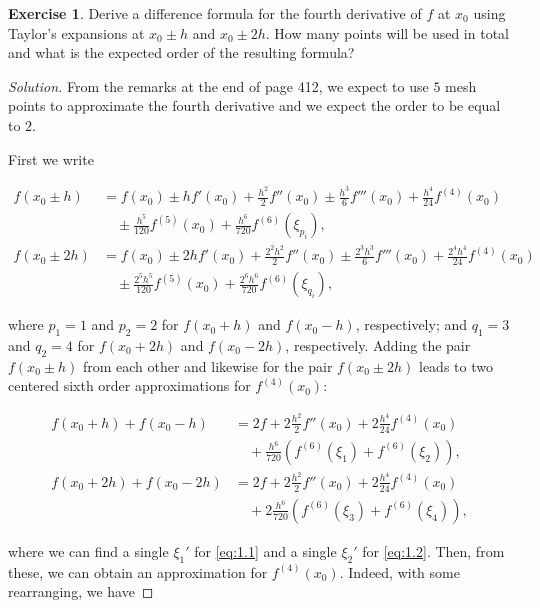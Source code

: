 \documentclass[12pt,a4]{article}
\theoremstyle{definition}
\newtheorem{exercise}{Exercise}
\begin{document}
\begin{exercise}
	Derive a difference formula for the fourth derivative of $f$ at $x_0$ using Taylor's expansions at $x_0 \pm h$ and $x_0 \pm 2 h$. How many points will be used in total and what is the expected order of the resulting formula?
\end{exercise}
\begin{proof}[Solution]
	From the remarks at the end of page 412, we expect to use $5$ mesh points to approximate the fourth derivative and we expect the order to be equal to $2$. 
	
	First we write
	
	\begin{align*}
	f(x_0 \pm h) &= f(x_0) \pm h f'(x_0) + \frac{h^2}{2} f''(x_0) \pm \frac{h^3}{6} f'''(x_0) + \frac{h^4}{24} f^{(4)}(x_0) \\
	 &\quad \pm \frac{h^5}{120} f^{(5)}(x_0) + \frac{h^6}{720} f^{(6)}(\xi_{p_i}) {,} \\
	f(x_0 \pm 2 h) &= f(x_0) \pm 2 h f'(x_0) + \frac{2^2 h^2}{2} f''(x_0) \pm \frac{2^3 h^3}{6} f'''(x_0) + \frac{2^4 h^4}{24} f^{(4)}(x_0) \\
	&\quad \pm \frac{2^5 h^5}{120} f^{(5)}(x_0) + \frac{2^6 h^6}{720} f^{(6)}(\xi_{q_i}) {,}
	\end{align*}
	
	\noindent where $p_1 = 1$ and $p_2 = 2$ for $f(x_0 + h)$ and $f(x_0 - h)$, respectively; and $q_1 = 3$ and $q_2 = 4$ for $f(x_0 + 2 h)$ and $f(x_0 - 2 h)$, respectively. Adding the pair $f(x_0 \pm h)$ from each other and likewise for the pair $f(x_0 \pm 2 h)$ leads to two centered sixth order approximations for $f^{(4)}(x_0)$:
	
	\begin{align*}
	f(x_0 + h) + f(x_0 - h) &= 2 f + 2 \frac{h^2}{2} f''(x_0) + 2 \frac{h^4}{24} f^{(4)} (x_0) \\
	 &\quad + \frac{h^6}{720} \left( f^{(6)}(\xi_1) + f^{(6)}(\xi_2) \right) {,} \tag{1.1} \label{eq:1.1} \\ 
	f(x_0 + 2 h) + f(x_0 - 2 h) &= 2 f + 2 \frac{h^2}{2} f''(x_0) + 2 \frac{h^4}{24} f^{(4)} (x_0) \\
	 &\quad + 2 \frac{h^6}{720} \left( f^{(6)}(\xi_3) + f^{(6)}(\xi_4) \right) {,} \tag{1.2} \label{eq:1.2} 
	\end{align*}
	
	\noindent where we can find a single $\xi_1'$ for \hyperref[eq:1.1]{\eqref{eq:1.1}} and a single $\xi_2'$ for \hyperref[eq:1.2]{\eqref{eq:1.2}}. Then, from these, we can obtain an approximation for $f^{(4)}(x_0)$. Indeed, with some rearranging, we have
	

\end{proof}
\end{document}
